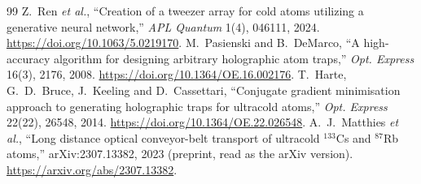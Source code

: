 \begin{thebibliography}{99}
 Z.~Ren \emph{et al.}, ``Creation of a tweezer array for cold atoms utilizing a generative neural network,'' \emph{APL Quantum} 1(4), 046111, 2024. \url{https://doi.org/10.1063/5.0219170}.
 M.~Pasienski and B.~DeMarco, ``A high-accuracy algorithm for designing arbitrary holographic atom traps,'' \emph{Opt. Express} 16(3), 2176, 2008. \url{https://doi.org/10.1364/OE.16.002176}.
 T.~Harte, G.~D.~Bruce, J.~Keeling and D.~Cassettari, ``Conjugate gradient minimisation approach to generating holographic traps for ultracold atoms,'' \emph{Opt. Express} 22(22), 26548, 2014. \url{https://doi.org/10.1364/OE.22.026548}.
 A.~J.~Matthies \emph{et al.}, ``Long distance optical conveyor-belt transport of ultracold $^{133}$Cs and $^{87}$Rb atoms,'' arXiv:2307.13382, 2023 (preprint, read as the arXiv version). \url{https://arxiv.org/abs/2307.13382}.
\end{thebibliography}
